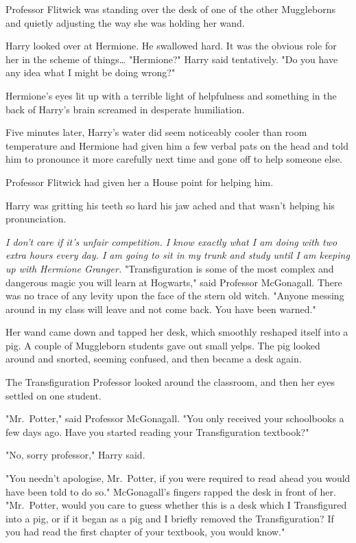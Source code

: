 Professor Flitwick was standing over the desk of one of the other Muggleborns 
and quietly adjusting the way she was holding her wand.

Harry looked over at Hermione. He swallowed hard. It was the obvious role for 
her in the scheme of things{\ldots} "Hermione?" Harry said tentatively. "Do you 
have any idea what I might be doing wrong?"

Hermione's eyes lit up with a terrible light of helpfulness and something in 
the back of Harry's brain screamed in desperate humiliation.

Five minutes later, Harry's water did seem noticeably cooler than room 
temperature and Hermione had given him a few verbal pats on the head and told 
him to pronounce it more carefully next time and gone off to help someone else.

Professor Flitwick had given her a House point for helping him.

Harry was gritting his teeth so hard his jaw ached and that wasn't helping his 
pronunciation.

\emph{I don't care if it's unfair competition. I know exactly what I am doing 
with two extra hours every day. I am going to sit in my trunk and study until I 
am keeping up with Hermione Granger.}
\sbreak
"Transfiguration is some of the most complex and dangerous magic you will learn 
at Hogwarts," said Professor McGonagall. There was no trace of any levity upon 
the face of the stern old witch. "Anyone messing around in my class will leave 
and not come back. You have been warned."

Her wand came down and tapped her desk, which smoothly reshaped itself into a 
pig. A couple of Muggleborn students gave out small yelps. The pig looked 
around and snorted, seeming confused, and then became a desk again.

The Transfiguration Professor looked around the classroom, and then her eyes 
settled on one student.

"Mr.~Potter," said Professor McGonagall. "You only received your schoolbooks a 
few days ago. Have you started reading your Transfiguration textbook?"

"No, sorry professor," Harry said.

"You needn't apologise, Mr.~Potter, if you were required to read ahead you 
would have been told to do so." McGonagall's fingers rapped the desk in front 
of her. "Mr.~Potter, would you care to guess whether this is a desk which I 
Transfigured into a pig, or if it began as a pig and I briefly removed the 
Transfiguration? If you had read the first chapter of your textbook, you would 
know."

